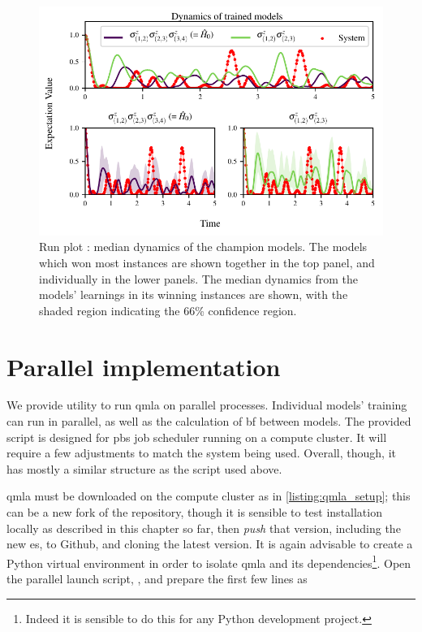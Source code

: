 \begin{figure}[H]
    \begin{center}
        \includegraphics{appendix/figures/run_analysis/dynamics.pdf}
    \end{center}
    \caption[Run plot: dynamics]{
        Run plot : median dynamics of the \glspl{champion model}. 
        The models which won most \glspl{instance} are shown together in the top panel, 
        and individually in the lower panels. 
        The median dynamics from the models' learnings in its winning \glspl{instance} are shown, 
        with the shaded region indicating the 66\% confidence region. 
    }
    \label{fig:run_dynamics}
\end{figure}



\section{Parallel implementation}\label{apdx:paralllel_processing}
We provide utility to run \gls{qmla} on parallel processes. 
Individual models' training can run in parallel, as well as the calculation of \gls{bf} between models. 
The provided script is designed for \gls{pbs} job scheduler running on a compute cluster. 
It will require a few adjustments to match the system being used. 
Overall, though, it has mostly a similar structure as the  script used above. 
\par 

\gls{qmla} must be downloaded on the compute cluster as in \cref{listing:qmla_setup};
    this can be a new fork of the repository, 
    though it is sensible to test installation locally as described in this chapter so far, 
    then \emph{push} that version, including the new \gls{es}, to Github, 
    and cloning the latest version.
It is again advisable to create a Python virtual environment in order to isolate \gls{qmla} 
    and its dependencies\footnote{Indeed it is sensible to do this for any Python development project.}.
Open the parallel launch script, , and prepare the first few lines as 

